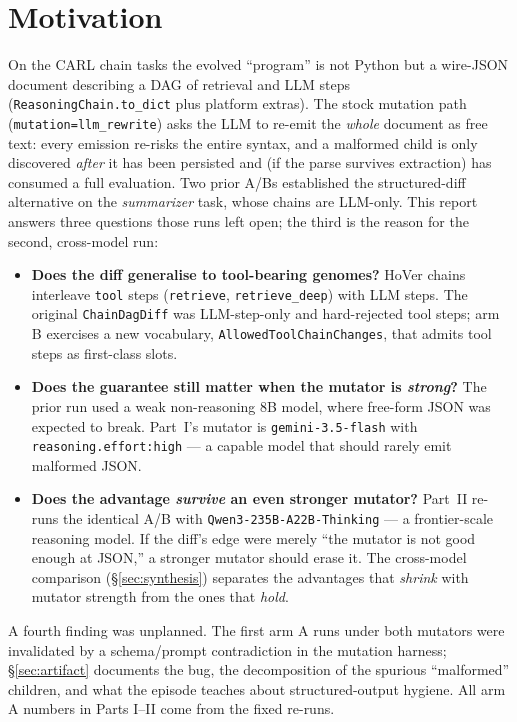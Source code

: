 \documentclass[11pt]{article}
\newcommand{\armA}{\textcolor{bad}{arm A}}
\newcommand{\armB}{\textcolor{accent}{arm B}}
\begin{document}
\section{Motivation}
On the CARL chain tasks the evolved ``program'' is not Python but a wire-JSON document
describing a DAG of retrieval and LLM steps (\texttt{ReasoningChain.to\_dict} plus platform
extras). The stock mutation path (\texttt{mutation=llm\_rewrite}) asks the LLM to re-emit the
\emph{whole} document as free text: every emission re-risks the entire syntax, and a malformed
child is only discovered \emph{after} it has been persisted and (if the parse survives
extraction) has consumed a full evaluation. Two prior A/Bs established the structured-diff
alternative on the \emph{summarizer} task, whose chains are LLM-only. This report answers three
questions those runs left open; the third is the reason for the second, cross-model run:
\begin{itemize}
  \item \textbf{Does the diff generalise to tool-bearing genomes?} HoVer chains interleave
  \texttt{tool} steps (\texttt{retrieve}, \texttt{retrieve\_deep}) with LLM steps. The
  original \texttt{ChainDagDiff} was LLM-step-only and hard-rejected tool steps; \armB{}
  exercises a new vocabulary, \texttt{AllowedToolChainChanges}, that admits tool steps as
  first-class slots.
  \item \textbf{Does the guarantee still matter when the mutator is \emph{strong}?} The prior
  run used a weak non-reasoning 8B model, where free-form JSON was expected to break. Part~I's
  mutator is \texttt{gemini-3.5-flash} with \texttt{reasoning.effort:high} --- a capable model
  that should rarely emit malformed JSON.
  \item \textbf{Does the advantage \emph{survive} an even stronger mutator?} Part~II re-runs the
  identical A/B with \texttt{Qwen3-235B-A22B-Thinking} --- a frontier-scale reasoning model. If
  the diff's edge were merely ``the mutator is not good enough at JSON,'' a stronger mutator
  should erase it. The cross-model comparison (\S\ref{sec:synthesis}) separates the advantages
  that \emph{shrink} with mutator strength from the ones that \emph{hold}.
\end{itemize}
A fourth finding was unplanned. The first \armA{} runs under both mutators were invalidated by a
schema/prompt contradiction in the mutation harness; \S\ref{sec:artifact} documents the bug, the
decomposition of the spurious ``malformed'' children, and what the episode teaches about
structured-output hygiene. All \armA{} numbers in Parts I--II come from the fixed re-runs.
\end{document}
